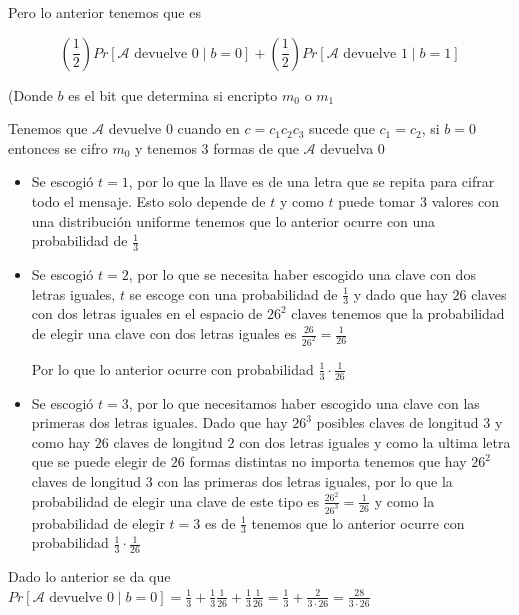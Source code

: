\documentclass[11pt]{article}
\begin{document}
        Pero lo anterior tenemos que es 
        
        \begin{equation}
            (\frac{1}{2}) Pr[\mathcal{A} \text{ devuelve } 0\mid b = 0] +  (\frac{1}{2}) Pr[\mathcal{A} \text{ devuelve } 1\mid b = 1] 
        \end{equation}
        
        (Donde $b$ es el bit que determina si encripto $m_0$ o $m_1$
        
        Tenemos que $\mathcal{A}$ devuelve $0$ cuando en $c = c_1 c_2 c_3$ sucede que $c_1 = c_2$, si $b = 0$ entonces se cifro $m_0$ y tenemos $3$ formas de que $\mathcal{A}$ devuelva $0$
        
        \begin{itemize}
            \item Se escogió $t = 1$, por lo que la llave es de una letra que se repita para cifrar todo el mensaje. Esto solo depende de $t$ y como $t$ puede tomar $3$ valores con una distribución uniforme tenemos que lo anterior ocurre con una probabilidad de $\frac{1}{3}$
            
            \item Se escogió $t = 2$, por lo que se necesita haber escogido una clave con dos letras iguales, $t$ se escoge con una probabilidad de $\frac{1}{3}$ y dado que hay $26$ claves con dos letras iguales en el espacio de $26^2$ claves tenemos que la probabilidad de elegir una clave con dos letras iguales es $\frac{26}{26^2} = \frac{1}{26}$
            
            Por lo que lo anterior ocurre con probabilidad $\frac{1}{3} \cdot \frac{1}{26}$
            
            
            \item Se escogió $t = 3$, por lo que necesitamos haber escogido una clave con las primeras dos letras iguales. Dado que hay $26^3$ posibles claves de longitud $3$ y como hay $26$ claves de longitud $2$ con dos letras iguales y como la ultima letra que se puede elegir de $26$ formas distintas no importa tenemos que hay $26^2$ claves de longitud $3$ con las primeras dos letras iguales, por lo que la probabilidad de elegir una clave de este tipo es $\frac{26^2}{26^3} = \frac{1}{26}$ y como la probabilidad de elegir $t = 3$ es de $\frac{1}{3}$ tenemos que lo anterior ocurre con probabilidad $\frac{1}{3} \cdot \frac{1}{26}$
        \end{itemize}
        
        Dado lo anterior se da que $ Pr[\mathcal{A} \text{ devuelve } 0\mid b = 0] = \frac{1}{3} + \frac{1}{3} \frac{1}{26} + \frac{1}{3} \frac{1}{26} = \frac{1}{3} + \frac{2}{3 \cdot 26} = \frac{28}{3 \cdot 26}$
        
\end{document}

